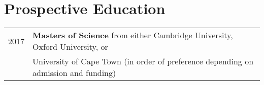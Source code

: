 \section{Prospective Education}
\begin{tabular}{R{3cm}|l}
  2017&
  \textbf{Masters of Science} from either Cambridge University, Oxford University,  or \\&University of Cape Town (in order of preference depending on admission and funding)
\end{tabular}
